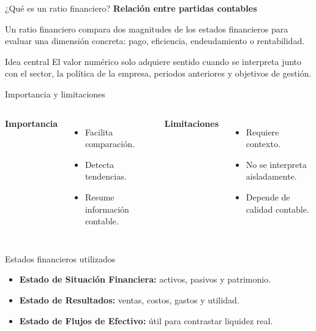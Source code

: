 \begin{frame}{¿Qué es un ratio financiero?}
\color{fundamentos}
\textbf{Relación entre partidas contables}
\color{black}

\vspace{0.7em}
Un ratio financiero compara dos magnitudes de los estados financieros para evaluar una dimensión concreta: pago, eficiencia, endeudamiento o rentabilidad.

\vspace{0.7em}
\begin{block}{Idea central}
El valor numérico solo adquiere sentido cuando se interpreta junto con el sector, la política de la empresa, periodos anteriores y objetivos de gestión.
\end{block}
\end{frame}

\begin{frame}{Importancia y limitaciones}
\begin{columns}[T]
\textbf{Importancia}
\begin{itemize}
  \item Facilita comparación.
  \item Detecta tendencias.
  \item Resume información contable.
\end{itemize}
\textbf{Limitaciones}
\begin{itemize}
  \item Requiere contexto.
  \item No se interpreta aisladamente.
  \item Depende de calidad contable.
\end{itemize}
\end{columns}
\end{frame}

\begin{frame}{Estados financieros utilizados}
\begin{itemize}
  \item \textbf{Estado de Situación Financiera:} activos, pasivos y patrimonio.
  \item \textbf{Estado de Resultados:} ventas, costos, gastos y utilidad.
  \item \textbf{Estado de Flujos de Efectivo:} útil para contrastar liquidez real.
\end{itemize}

\vspace{0.8em}
\begin{center}
\end{center}
\end{frame}


